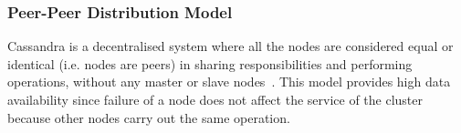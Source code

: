 \subsubsection{Peer-Peer Distribution Model}
Cassandra is a decentralised system  where all the nodes are considered equal
or identical (i.e.  nodes are peers) in sharing responsibilities and performing
operations,  without any  master or slave nodes~\citep{datastaxB,BOOK}. 
This model provides high data availability since failure
of a node does not affect the service of the cluster  because other
nodes carry out the same operation. 


